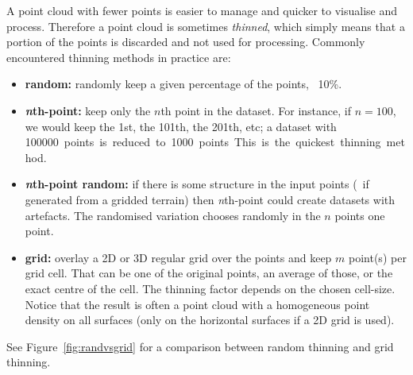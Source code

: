 A point cloud with fewer points is easier to manage and quicker to visualise and process.
Therefore a point cloud is sometimes \emph{thinned}, which simply means that a portion of the points is discarded and not used for processing.
Commonly encountered thinning methods in practice are:
\begin{itemize}
  \item \textbf{random:} randomly keep a given percentage of the points, \eg\ 10\%.
  \item \textbf{\emph{n}th-point:} keep only the $n$th point in the dataset. For instance, if $n=100$, we would keep the 1st, the 101th, the 201th, etc; a dataset with \qty{100000} points is reduced to \qty{1000} points. This is the quickest thinning method.
  \item \textbf{\emph{n}th-point random:} if there is some structure in the input points (\eg\ if generated from a gridded terrain) then \emph{n}th-point could create datasets with artefacts. The randomised variation chooses randomly in the $n$ points one point.
  \item \textbf{grid: }overlay a 2D or 3D regular grid over the points and keep $m$ point(s) per grid cell. That can be one of the original points, an average of those, or the exact centre of the cell. The thinning factor depends on the chosen cell-size. Notice that the result is often a point cloud with a homogeneous point density on all surfaces (only on the horizontal surfaces if a 2D grid is used).
\end{itemize}
See Figure~\ref{fig:randvsgrid} for a comparison between random thinning and grid thinning.
